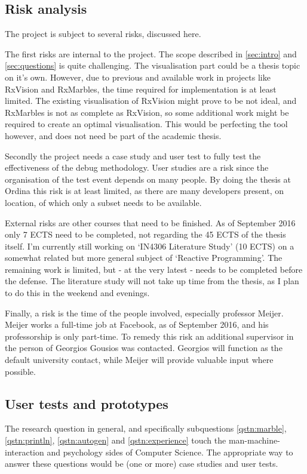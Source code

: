 \subsection{Risk analysis} The project is subject to several risks,
discussed here.

The first risks are internal to the project.  The scope described in
\autoref{sec:intro} and~%
\ref{sec:questions} is quite challenging.  The visualisation part could
be a thesis topic on it's own.  However, due to previous and available
work in projects like RxVision and RxMarbles, the time required for
implementation is at least limited.  The existing visualisation of
RxVision might prove to be not ideal, and RxMarbles is not as complete
as RxVision, so some additional work might be required to create an
optimal visualisation.  This would be perfecting the tool however, and
does not need be part of the academic thesis.

Secondly the project needs a case study and user test to fully test the
effectiveness of the debug methodology.  User studies are a risk since
the organisation of the test event depends on many people.  By doing the
thesis at Ordina this risk is at least limited, as there are many
developers present, on location, of which only a subset needs to be
available.

External risks are other courses that need to be finished.  As of
September 2016 only 7 ECTS need to be completed, not regarding the 45
ECTS of the thesis itself.  I'm currently still working on `IN4306
Literature Study' (10 ECTS) on a somewhat related but more general
subject of `Reactive Programming'.  The remaining work is limited, but -
at the very latest - needs to be completed before the defense.  The
literature study will not take up time from the thesis, as I plan to do
this in the weekend and evenings.

Finally, a risk is the time of the people involved, especially professor
Meijer.  Meijer works a full-time job at Facebook, as of September 2016,
and his professorship is only part-time.  To remedy this risk an
additional supervisor in the person of Georgios Gousios was contacted.
Georgios will function as the default university contact, while Meijer
will provide valuable input where possible.

\subsection{User tests and prototypes} The research question in general,
and specifically subquestions%
\ref{qstn:marble},%
\ref{qstn:println},%
\ref{qstn:autogen} and%
\ref{qstn:experience} touch the man-machine-interaction and psychology
sides of Computer Science.  The appropriate way to answer these
questions would be (one or more) case studies and user tests.

